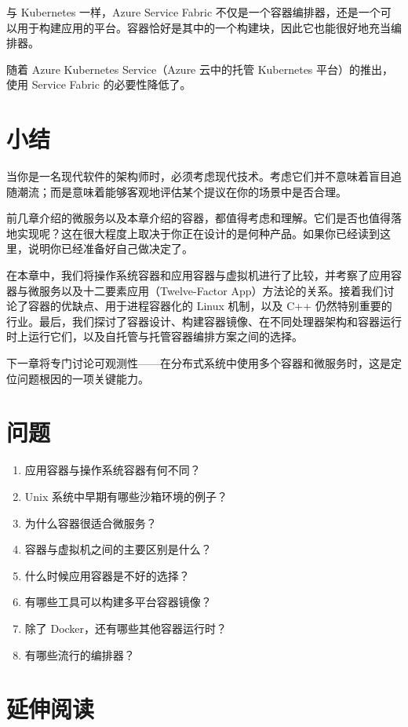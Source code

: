 与 Kubernetes 一样，Azure Service Fabric 不仅是一个容器编排器，还是一个可以用于构建应用的平台。容器恰好是其中的一个构建块，因此它也能很好地充当编排器。

随着 Azure Kubernetes Service（Azure 云中的托管 Kubernetes 平台）的推出，使用 Service Fabric 的必要性降低了。

\section{小结}

当你是一名现代软件的架构师时，必须考虑现代技术。考虑它们并不意味着盲目追随潮流；而是意味着能够客观地评估某个提议在你的场景中是否合理。

前几章介绍的微服务以及本章介绍的容器，都值得考虑和理解。它们是否也值得落地实现呢？这在很大程度上取决于你正在设计的是何种产品。如果你已经读到这里，说明你已经准备好自己做决定了。

在本章中，我们将操作系统容器和应用容器与虚拟机进行了比较，并考察了应用容器与微服务以及十二要素应用（Twelve-Factor App）方法论的关系。接着我们讨论了容器的优缺点、用于进程容器化的 Linux 机制，以及 C++ 仍然特别重要的行业。最后，我们探讨了容器设计、构建容器镜像、在不同处理器架构和容器运行时上运行它们，以及自托管与托管容器编排方案之间的选择。

下一章将专门讨论可观测性——在分布式系统中使用多个容器和微服务时，这是定位问题根因的一项关键能力。

\section{问题}

\begin{enumerate}
\item 应用容器与操作系统容器有何不同？
\item Unix 系统中早期有哪些沙箱环境的例子？
\item 为什么容器很适合微服务？
\item 容器与虚拟机之间的主要区别是什么？
\item 什么时候应用容器是不好的选择？
\item 有哪些工具可以构建多平台容器镜像？
\item 除了 Docker，还有哪些其他容器运行时？
\item 有哪些流行的编排器？
\end{enumerate}

\section{延伸阅读}

